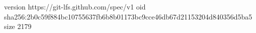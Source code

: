 version https://git-lfs.github.com/spec/v1
oid sha256:2b0c59f884bc10755637fb6b8b01173bc9cce46db67d21153204d840356d5ba5
size 2179
